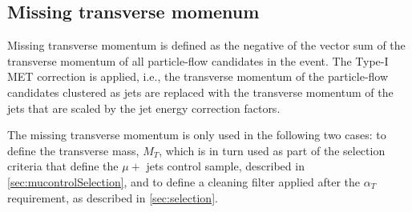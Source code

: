 \subsection{Missing transverse momenum}
Missing transverse momentum is defined as the negative of the vector sum
of the transverse momentum of all particle-flow candidates in the event.
The Type-I MET correction is applied, i.e., the transverse momentum of
the particle-flow candidates clustered as jets are replaced with the
transverse momentum of the jets that are scaled by the jet energy
correction factors.

The missing transverse momentum is only used in the following two cases:
to define the transverse mass, $M_{T}$, which is in turn used as part of
the selection criteria that define the $\mu +$ jets control sample,
described in \ref{sec:mucontrolSelection}, and to define a cleaning filter applied after the
$\alpha_{T}$ requirement, as described in \ref{sec:selection}.



